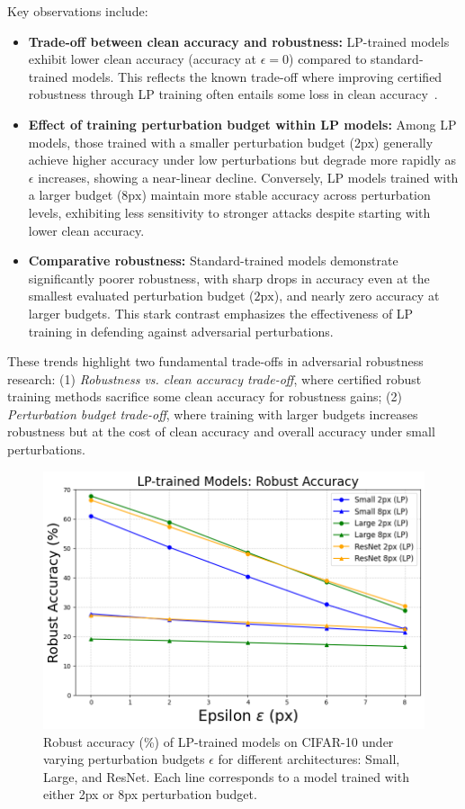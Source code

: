 Key observations include:  
\begin{itemize}
    \item \textbf{Trade-off between clean accuracy and robustness:} LP-trained models exhibit lower clean accuracy (accuracy at $\epsilon=0$) compared to standard-trained models. This reflects the known trade-off where improving certified robustness through LP training often entails some loss in clean accuracy~\cite{wong2018provable}.
    \item \textbf{Effect of training perturbation budget within LP models:} Among LP models, those trained with a smaller perturbation budget ($2\text{px}$) generally achieve higher accuracy under low perturbations but degrade more rapidly as $\epsilon$ increases, showing a near-linear decline. Conversely, LP models trained with a larger budget ($8\text{px}$) maintain more stable accuracy across perturbation levels, exhibiting less sensitivity to stronger attacks despite starting with lower clean accuracy.
    \item \textbf{Comparative robustness:} Standard-trained models demonstrate significantly poorer robustness, with sharp drops in accuracy even at the smallest evaluated perturbation budget ($2\text{px}$), and nearly zero accuracy at larger budgets. This stark contrast emphasizes the effectiveness of LP training in defending against adversarial perturbations.
\end{itemize}

These trends highlight two fundamental trade-offs in adversarial robustness research:  
(1) \textit{Robustness vs. clean accuracy trade-off}, where certified robust training methods sacrifice some clean accuracy for robustness gains;  
(2) \textit{Perturbation budget trade-off}, where training with larger budgets increases robustness but at the cost of clean accuracy and overall accuracy under small perturbations.



\begin{figure}[htbp]
    \centering
    \includegraphics[width=0.80\linewidth]{images/LP_MODEL_STRUCTURE.png}
    \caption{Robust accuracy (\%) of LP-trained models on CIFAR-10 under varying perturbation budgets $\epsilon$ for different architectures: Small, Large, and ResNet. Each line corresponds to a model trained with either 2px or 8px perturbation budget.}
    \label{fig:lp_model_structure}
\end{figure}

